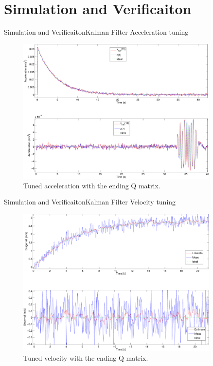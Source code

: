 \documentclass[10pt,handout]{beamer}
\begin{document}
\section{Simulation and Verificaiton}
\begin{frame}{Simulation and Verificaiton}{Kalman Filter}
Acceleration tuning
  \begin{figure}
    \includegraphics[width=0.9\textwidth]{../../code/matlab/accel0,00001}
    \caption{\scriptsize Tuned acceleration with the ending Q matrix.}
    \label{fig:acceltuning}
  \end{figure}
\end{frame}

\begin{frame}{Simulation and Verificaiton}{Kalman Filter}
Velocity tuning
  \begin{figure}
    \includegraphics[width=0.9\textwidth]{../../code/matlab/uv0,00001}
    \caption{\scriptsize Tuned velocity with the ending Q matrix.}
    \label{fig:uvtuning}
  \end{figure}
\end{frame}
\end{document}
